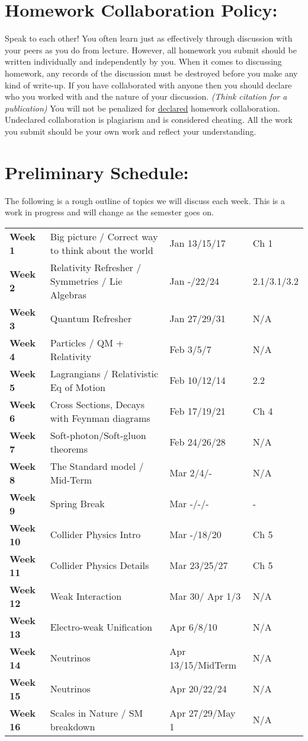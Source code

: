 \documentclass[margin,line]{res}
\begin{document}
\begin{resume}
\section{Homework Collaboration Policy:} 

Speak to each other!
You often learn just as effectively through discussion with your peers as you do from lecture. 
However, all homework you submit should be written individually and independently by you.
When it comes to discussing homework, any records of the discussion must be destroyed before you make any kind of write-up. 
If you have collaborated with anyone then you should declare who you worked with and the nature of your discussion. 
\textit{(Think citation for a publication)}
You will not be penalized for \underline{declared} homework collaboration. 
Undeclared collaboration is plagiarism and is considered cheating. 
All the work you submit should be your own work and reflect your understanding.


\section{Preliminary Schedule:}

The following is a rough outline of topics we will discuss each week. 
This is a work in progress and will change as the semester goes on.

\begin{tabular}{llll}
\textbf{Week 1}  & Big picture / Correct way to think about the world & Jan 13/15/17 & Ch 1\\
\textbf{Week 2}  & Relativity Refresher / Symmetries /  Lie Algebras & Jan -/22/24 & 2.1/3.1/3.2\\
\textbf{Week 3}  & Quantum Refresher  & Jan 27/29/31 & N/A\\
\textbf{Week 4}  & Particles / QM + Relativity & Feb 3/5/7 & N/A\\
\textbf{Week 5}  & Lagrangians / Relativistic Eq of Motion & Feb 10/12/14 & 2.2\\
\textbf{Week 6}  & Cross Sections, Decays with Feynman diagrams  & Feb 17/19/21 & Ch 4\\
\textbf{Week 7}  & Soft-photon/Soft-gluon theorems  & Feb 24/26/28 & N/A\\
\textbf{Week 8}  & The Standard model / Mid-Term & Mar 2/4/- & N/A\\
\textbf{Week 9}  & Spring Break & Mar -/-/- & - \\
\textbf{Week 10} & Collider Physics Intro & Mar -/18/20 & Ch 5 \\
\textbf{Week 11} & Collider Physics Details & Mar 23/25/27 & Ch 5\\
\textbf{Week 12} & Weak Interaction  & Mar 30/ Apr 1/3 & N/A\\
\textbf{Week 13} & Electro-weak Unification & Apr 6/8/10 & N/A\\
\textbf{Week 14} & Neutrinos & Apr 13/15/MidTerm & N/A\\
\textbf{Week 15} & Neutrinos & Apr 20/22/24 & N/A \\
\textbf{Week 16} & Scales in Nature / SM breakdown  & Apr 27/29/May 1 & N/A\\
\end{tabular}

\end{resume}
\end{document}
